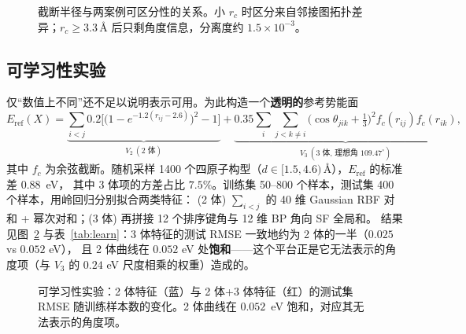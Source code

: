\documentclass[UTF8,a4paper,11pt]{ctexart}
\newcommand{\ang}{\,\text{\AA}}
\begin{document}
\begin{figure}[H]
\centering
{}
\caption{截断半径与两案例可区分性的关系。小 $r_c$ 时区分来自邻接图拓扑差异；$r_c\ge3.3\ang$ 后只剩角度信息，分离度约 $1.5\times10^{-3}$。}
\label{fig:cutoff}
\end{figure}

\subsection{可学习性实验}
\label{sec:learn}
仅“数值上不同”还不足以说明表示可用。为此构造一个\textbf{透明的}参考势能面
\begin{equation}
E_{\mathrm{ref}}(X)=\underbrace{\sum_{i<j}0.2\Big[\big(1-e^{-1.2(r_{ij}-2.6)}\big)^2-1\Big]}_{V_2\ (\text{2 体})}
+\underbrace{0.35\sum_{i}\sum_{j<k\ne i}\Big(\cos\theta_{jik}+\tfrac13\Big)^2 f_c(r_{ij})f_c(r_{ik})}_{V_3\ (\text{3 体, 理想角 }109.47^\circ)},
\end{equation}
其中 $f_c$ 为余弦截断。随机采样 1400 个四原子构型（$d\in[1.5,4.6)\ang$），$E_{\mathrm{ref}}$ 的标准差 $0.88$~eV，
其中 3 体项的方差占比 $7.5\%$。训练集 50--800 个样本，测试集 400 个样本，用岭回归分别拟合两类特征：
(2 体) $\sum_{i<j}$ 的 40 维 Gaussian RBF 对和 + 幂次对和；(3 体) 再拼接 12 个排序键角与 12 维 BP 角向 SF 全局和。
结果见图~\ref{fig:learn} 与表~\ref{tab:learn}：3 体特征的测试 RMSE 一致地约为 2 体的一半（$0.025$ vs $0.052$ eV），
且 2 体曲线在 $0.052$ eV 处\textbf{饱和}——这个平台正是它无法表示的角度项（与 $V_3$ 的 $0.24$ eV 尺度相乘的权重）造成的。

\begin{figure}[H]
\centering
{}
\caption{可学习性实验：2 体特征（蓝）与 2 体+3 体特征（红）的测试集 RMSE 随训练样本数的变化。2 体曲线在 $0.052$~eV 饱和，对应其无法表示的角度项。}
\label{fig:learn}
\end{figure}
\end{document}
